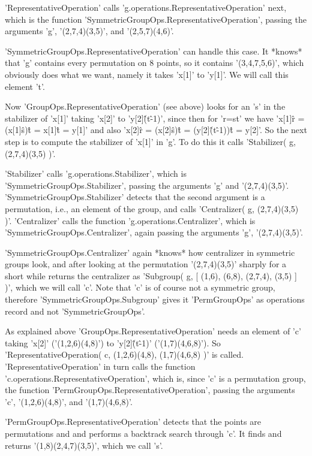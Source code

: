 'RepresentativeOperation'  calls   'g.operations.RepresentativeOperation'
next, which is  the function 'SymmetricGroupOps.RepresentativeOperation',
passing the arguments 'g', '(2,7,4)(3,5)', and '(2,5,7)(4,6)'.

'SymmetricGroupOps.RepresentativeOperation'  can  handle this  case.   It
*knows* that 'g'  contains every permutation on  8 points, so it contains
'(3,4,7,5,6)', which obviously does what we  want, namely it takes 'x[1]'
to 'y[1]'.  We will call this element 't'.

Now 'GroupOps.RepresentativeOperation' (see above) looks for  an  's'  in
the stabilizer of 'x[1]' taking 'x[2]' to 'y[2]\^(t\^-1)', since then for
'r=s\*t'  we have 'x[1]\^r  =  (x[1]\^s)\^t  =  x[1]\^t = y[1]'  and also
'x[2]\^r = (x[2]\^s)\^t = (y[2]\^(t\^-1))\^t = y[2]'.   So the next  step
is  to  compute  the stabilizer  of 'x[1]' in 'g'.  To  do  this it calls
'Stabilizer( g, (2,7,4)(3,5) )'.

'Stabilizer'     calls      'g.operations.Stabilizer',      which      is
'SymmetricGroupOps.Stabilizer',    passing   the    arguments   'g'   and
'(2,7,4)(3,5)'.  'SymmetricGroupOps.Stabilizer' detects  that  the second
argument is a  permutation,  i.e.,  an  element of  the group,  and calls
'Centralizer(  g,  (2,7,4)(3,5)  )'.   'Centralizer'  calls the  function
'g.operations.Centralizer',  which   is  'SymmetricGroupOps.Centralizer',
again passing the arguments 'g', '(2,7,4)(3,5)'.

'SymmetricGroupOps.Centralizer'   again  *knows*   how   centralizer   in
symmetric   groups  look,   and   after   looking   at  the   permutation
'(2,7,4)(3,5)'  sharply  for  a  short while returns  the  centralizer as
'Subgroup( g,  [ (1,6), (6,8),  (2,7,4), (3,5)  ] )', which we will  call
'c'.   Note  that  'c'  is of  course not  a  symmetric group,  therefore
'SymmetricGroupOps.Subgroup' gives it 'PermGroupOps' as operations record
and not 'SymmetricGroupOps'.

As explained above 'GroupOps.RepresentativeOperation' needs an element of
'c' taking 'x[2]'  ('(1,2,6)(4,8)') to 'y[2]\^(t\^-1)'  ('(1,7)(4,6,8)').
So 'RepresentativeOperation( c, (1,2,6)(4,8), (1,7)(4,6,8) )' is  called.
'RepresentativeOperation'     in     turn     calls     the      function
'c.operations.RepresentativeOperation',  which   is,  since   'c'   is  a
permutation group,  the function  'PermGroupOps.RepresentativeOperation',
passing the arguments 'c', '(1,2,6)(4,8)', and '(1,7)(4,6,8)'.

'PermGroupOps.RepresentativeOperation'  detects   that   the  points  are
permutations and and performs a backtrack  search through 'c'.  It  finds
and returns '(1,8)(2,4,7)(3,5)', which we call 's'.

